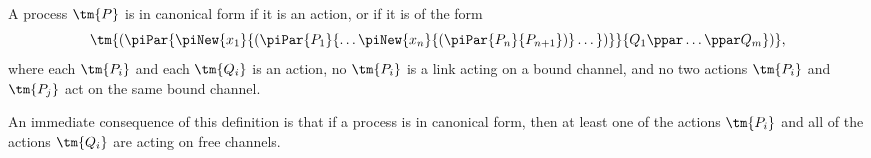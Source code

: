 \begin{definition}\label{def:hcp-canonical-forms}
  A process $\tm{P}$ is in canonical form if it is an action, or if it is of the
  form
  \[
    \tm{(\piPar{
        \piNew{x_1}{(\piPar{P_1}{\dots \piNew{x_n}{(\piPar{P_n}{P_{n+1}})} \dots})}
      }{
        Q_1 \ppar \dots \ppar Q_m
      })},
  \]
  where each $\tm{P_i}$ and each $\tm{Q_i}$ is an action, no $\tm{P_i}$ is a
  link acting on a bound channel, and no two actions $\tm{P_i}$ and $\tm{P_j}$
  act on the same bound channel.

  An immediate consequence of this definition is that if a process is in
  canonical form, then at least one of the actions $\tm{P_i}$ and all of the
  actions $\tm{Q_i}$ are acting on free channels.
\end{definition}
